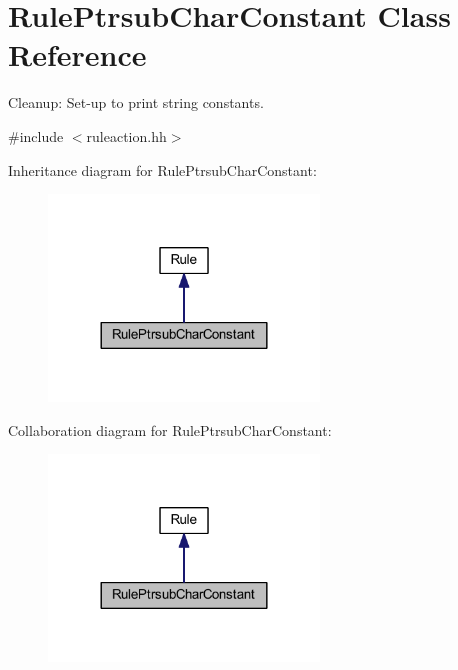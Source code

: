 \hypertarget{class_rule_ptrsub_char_constant}{}\section{Rule\+Ptrsub\+Char\+Constant Class Reference}
\label{class_rule_ptrsub_char_constant}


Cleanup\+: Set-\/up to print string constants.  




{\ttfamily \#include $<$ruleaction.\+hh$>$}



Inheritance diagram for Rule\+Ptrsub\+Char\+Constant\+:
\nopagebreak
\begin{figure}[H]
\begin{center}
\leavevmode
\includegraphics[width=204pt]{class_rule_ptrsub_char_constant__inherit__graph}
\end{center}
\end{figure}


Collaboration diagram for Rule\+Ptrsub\+Char\+Constant\+:
\nopagebreak
\begin{figure}[H]
\begin{center}
\leavevmode
\includegraphics[width=204pt]{class_rule_ptrsub_char_constant__coll__graph}
\end{center}
\end{figure}
